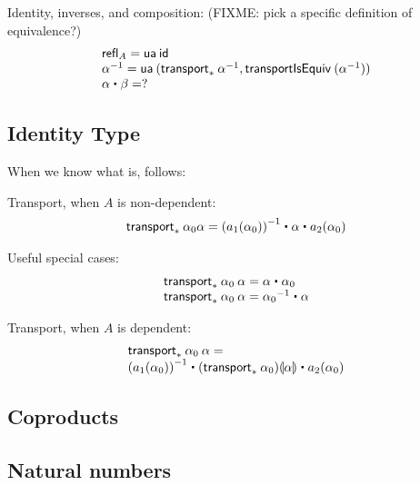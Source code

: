 Identity, inverses, and composition: (FIXME: pick a specific definition
of equivalence?)
\[
\begin{array}{l}
\refl{A} = \ua{\idfunc} \\
\opp{\alpha} = \ua {(\transport {X \mapsto X} {\opp \alpha}, \mathsf{transportIsEquiv} \: (\opp \alpha))} \\ 
{\alpha} \ct \beta = ? \\
\end{array}
\]

\subsection{Identity Type}
\label{sec:compute-paths}

When we know what \id[A]{}{} is, \id[ {\id[A]{}{}} ]{}{} follows:

Transport, when $A$ is non-dependent:
\[
\begin{array}{l}
\transport{x_0:A_0 \mapsto \id[A] {a_1(x_0)}{a_2(x_0)}} {\alpha_0}{\alpha} = 
\opp{(\map{a_1}{\alpha_0})} \ct \alpha \ct \map{a_2}{\alpha_0}
\end{array}
\]

Useful special cases:
\[
\begin{array}{l}
\transport{x:A \mapsto \id[A] {a}{x}} {\alpha_0} \: {\alpha} = \alpha \ct \alpha_0 \\
\transport{x:A \mapsto \id[A] {x_0}{a}} {\alpha_0} \: {\alpha} = \opp {\alpha_0} \ct \alpha \\
\end{array}
\]

Transport, when $A$ is dependent:
\[
\begin{array}{l}
\transport{x_0:A_0 \mapsto \id[A(x_0)] {a_1(x_0)}{a_2(x_0)}} {\alpha_0} \: {\alpha} = \\
\opp{(\map{a_1}{\alpha_0})} \ct \mapdep{(\transport{A}{\alpha_0})}{\alpha} \ct \map{a_2}{\alpha_0}
\end{array}
\]

\subsection{Coproducts}
\label{sec:compute-coprod}

\subsection{Natural numbers}
\label{sec:compute-nat}




